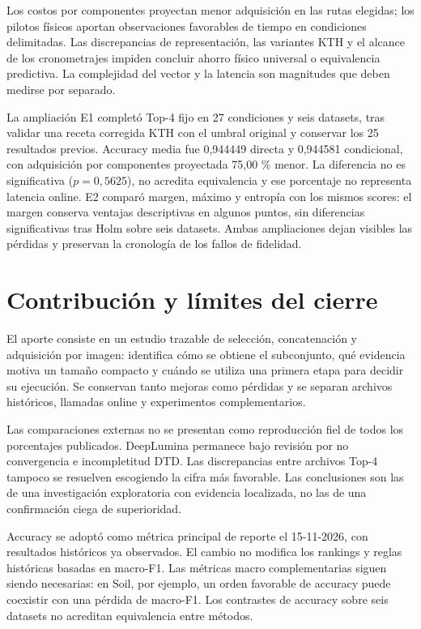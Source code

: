 Los costos por componentes proyectan menor adquisición en las rutas elegidas; los pilotos físicos aportan observaciones favorables de tiempo en condiciones delimitadas. Las discrepancias de representación, las variantes KTH y el alcance de los cronometrajes impiden concluir ahorro físico universal o equivalencia predictiva. La complejidad del vector y la latencia son magnitudes que deben medirse por separado.

La ampliación E1 completó Top-4 fijo en 27 condiciones y seis datasets, tras validar una receta corregida KTH con el umbral original y conservar los 25 resultados previos. Accuracy media fue 0,944449 directa y 0,944581 condicional, con adquisición por componentes proyectada 75,00 \% menor. La diferencia no es significativa (\(p=0,5625\)), no acredita equivalencia y ese porcentaje no representa latencia online. E2 comparó margen, máximo y entropía con los mismos scores: el margen conserva ventajas descriptivas en algunos puntos, sin diferencias significativas tras Holm sobre seis datasets. Ambas ampliaciones dejan visibles las pérdidas y preservan la cronología de los fallos de fidelidad.

\section{Contribución y límites del cierre}
El aporte consiste en un estudio trazable de selección, concatenación y adquisición por imagen: identifica cómo se obtiene el subconjunto, qué evidencia motiva un tamaño compacto y cuándo se utiliza una primera etapa para decidir su ejecución. Se conservan tanto mejoras como pérdidas y se separan archivos históricos, llamadas online y experimentos complementarios.

Las comparaciones externas no se presentan como reproducción fiel de todos los porcentajes publicados. DeepLumina permanece bajo revisión por no convergencia e incompletitud DTD. Las discrepancias entre archivos Top-4 tampoco se resuelven escogiendo la cifra más favorable. Las conclusiones son las de una investigación exploratoria con evidencia localizada, no las de una confirmación ciega de superioridad.

Accuracy se adoptó como métrica principal de reporte el 15-11-2026, con resultados históricos ya observados. El cambio no modifica los rankings y reglas históricas basadas en macro-F1. Las métricas macro complementarias siguen siendo necesarias: en Soil, por ejemplo, un orden favorable de accuracy puede coexistir con una pérdida de macro-F1. Los contrastes de accuracy sobre seis datasets no acreditan equivalencia entre métodos.

